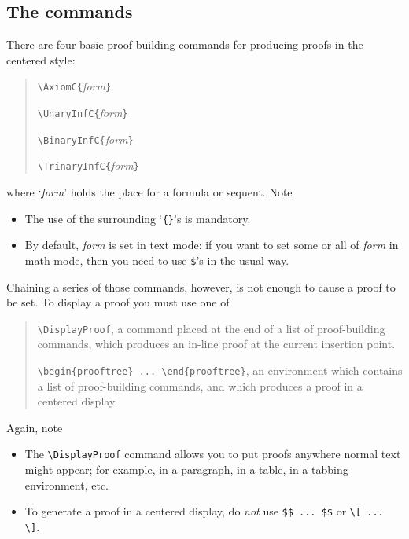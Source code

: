 \documentclass[11pt]{article}
\begin{document}
\subsection{The commands} There are four basic proof-building commands for producing proofs in the centered style:
\begin{quote}
\begin{description}\setlength{\itemsep}{0.0in}
\item   \verb=\AxiomC{=\textit{form}\verb=}=
\item   \verb=\UnaryInfC{=\textit{form}\verb=}=
\item   \verb=\BinaryInfC{=\textit{form}\verb=}=
\item   \verb=\TrinaryInfC{=\textit{form}\verb=}=
\end{description}
\end{quote}  
where `\textit{form}' holds the place for a formula or sequent. Note
\begin{itemize}\setlength{\itemsep}{0.0in}
\item The use of the surrounding `\verb={}='s is mandatory. 
\item By default, \textit{form} is set in text mode: if you want to set some or all of \textit{form} in math mode, then you need to use \verb=$='s in the usual way.
\end{itemize}
Chaining a series of those commands, however, is not enough to cause a proof to be set. To display a proof you must use one of
\begin{quote}
\begin{description}\setlength{\itemsep}{0.0in}
\item   \verb=\DisplayProof=, a command placed at the end of a list of proof-building commands, which produces an in-line proof at the current insertion point.
\item   \verb=\begin{prooftree} ... \end{prooftree}=, an environment which contains a list of proof-building commands, and which produces a  proof in a centered display. 
\end{description}
\end{quote}  
Again, note
\begin{itemize}\setlength{\itemsep}{0.0in}
\item The \verb=\DisplayProof= command  allows you to put proofs anywhere normal text might appear; for example, in a paragraph, in a table, in a tabbing environment, etc. 
\item To generate a proof in a centered display, do \emph{not} use \verb=$$ ... $$= or \verb=\[ ... \]=.
\end{itemize}
\end{document}
